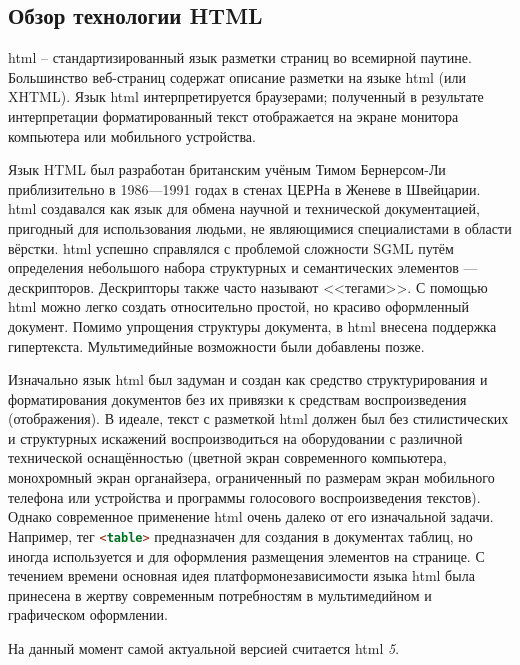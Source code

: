 \subsection{Обзор технологии HTML}

\gls{html} -- стандартизированный язык разметки страниц во всемирной паутине. Большинство веб-страниц содержат описание разметки на языке \gls{html} (или XHTML). Язык \gls{html} интерпретируется браузерами; полученный в результате интерпретации форматированный текст отображается на экране монитора компьютера или мобильного устройства.

Язык HTML был разработан британским учёным Тимом Бернерсом-Ли приблизительно в 1986—1991 годах в стенах ЦЕРНа в Женеве в Швейцарии. \gls{html} создавался как язык для обмена научной и технической документацией, пригодный для использования людьми, не являющимися специалистами в области вёрстки. \gls{html} успешно справлялся с проблемой сложности SGML путём определения небольшого набора структурных и семантических элементов — дескрипторов. Дескрипторы также часто называют <<тегами>>. С помощью \gls{html} можно легко создать относительно простой, но красиво оформленный документ. Помимо упрощения структуры документа, в \gls{html} внесена поддержка гипертекста. Мультимедийные возможности были добавлены позже\cite{wiki:HTML}.

Изначально язык \gls{html} был задуман и создан как средство структурирования и форматирования документов без их привязки к средствам воспроизведения (отображения). В идеале, текст с разметкой \gls{html} должен был без стилистических и структурных искажений воспроизводиться на оборудовании с различной технической оснащённостью (цветной экран современного компьютера, монохромный экран органайзера, ограниченный по размерам экран мобильного телефона или устройства и программы голосового воспроизведения текстов). Однако современное применение \gls{html} очень далеко от его изначальной задачи. Например, тег \lstinline[language=HTML]{<table>} предназначен для создания в документах таблиц, но иногда используется и для оформления размещения элементов на странице. С течением времени основная идея платформонезависимости языка \gls{html} была принесена в жертву современным потребностям в мультимедийном и графическом оформлении.

На данный момент самой актуальной версией считается \gls{html} \textit{5}.